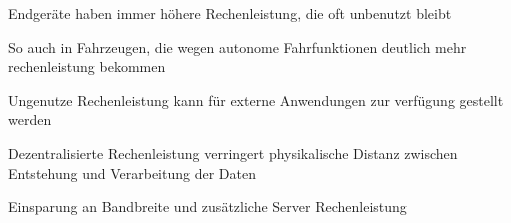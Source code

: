 \begin{notes}
\begin{notes}
        \item Endgeräte haben immer höhere Rechenleistung, die oft unbenutzt bleibt
        \item So auch in Fahrzeugen, die wegen autonome Fahrfunktionen deutlich mehr rechenleistung bekommen
        \item Ungenutze Rechenleistung kann für externe Anwendungen zur verfügung gestellt werden
        \item Dezentralisierte Rechenleistung verringert physikalische Distanz zwischen Entstehung und Verarbeitung der Daten
        \item Einsparung an Bandbreite und zusätzliche Server Rechenleistung
    \end{notes}
\end{notes} 